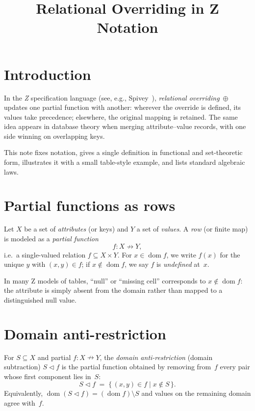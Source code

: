 \documentclass{article}
\title{Relational Overriding in Z Notation}
\date{}
\newcommand{\dom}{\operatorname{dom}}
\begin{document}
\maketitle

\section{Introduction}

In the \emph{Z} specification language (see, e.g., Spivey~\cite{spivey-z}), \emph{relational overriding}~$\oplus$ updates one partial function with another: wherever the override is defined, its values take precedence; elsewhere, the original mapping is retained. The same idea appears in database theory when merging attribute--value records, with one side winning on overlapping keys.

This note fixes notation, gives a single definition in functional and set-theoretic form, illustrates it with a small table-style example, and lists standard algebraic laws.

\section{Partial functions as rows}

Let $X$ be a set of \emph{attributes} (or keys) and $Y$ a set of \emph{values}. A \emph{row} (or finite map) is modeled as a \emph{partial function}
\[
  f \colon X \nrightarrow Y,
\]
i.e.\ a single-valued relation $f \subseteq X \times Y$. For $x \in \dom f$, we write $f(x)$ for the unique $y$ with $(x,y) \in f$; if $x \notin \dom f$, we say $f$ is \emph{undefined} at~$x$.

In many Z models of tables, ``null'' or ``missing cell'' corresponds to $x \notin \dom f$: the attribute is simply absent from the domain rather than mapped to a distinguished null value.

\section{Domain anti-restriction}

For $S \subseteq X$ and partial $f \colon X \nrightarrow Y$, the \emph{domain anti-restriction} (domain subtraction) $S \vartriangleleft f$ is the partial function obtained by removing from~$f$ every pair whose first component lies in~$S$:
\[
  S \vartriangleleft f
  \;=\;
  \{\, (x,y) \in f \mid x \notin S \,\}.
\]
Equivalently, $\dom(S \vartriangleleft f) = (\dom f) \setminus S$ and values on the remaining domain agree with~$f$.
\end{document}
